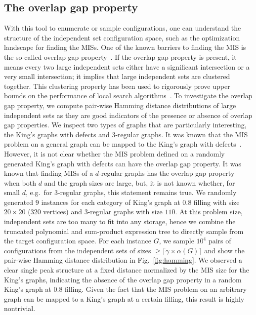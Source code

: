 \documentclass[onefignum, onetabnum]{siamart190516}
\newcommand{\<}{\langle}
\renewcommand{\>}{\rangle}
\newcommand{\Fig}[1]{Fig.~\ref{#1}}
\begin{document}
\subsection{The overlap gap property\label{sec:overlap-gap}}
With this tool to enumerate or sample configurations, one can understand the structure of the independent set configuration space, such as the optimization landscape for finding the MISs.
One of the known barriers to finding the MIS is the so-called overlap gap property~\cite{Gamarnik2013, Gamarnik2019}.
If the overlap gap property is present, it means every two large independent sets either have a significant intersection or a very small intersection;
it implies that large independent sets are clustered together.
This clustering property has been used to rigorously prove upper bounds on the performance of local search algorithms~\cite{Gamarnik2013, Gamarnik2019}.
To investigate the overlap gap property, we compute pair-wise Hamming distance distributions of large independent sets as they are good indicators of the presence or absence of overlap gap properties.
We inspect two types of graphs that are particularly interesting, the King's graphs with defects and $3$-regular graphs.
It was known that the MIS problem on a general graph can be mapped to the King's graph with defects~\cite{Ebadi2022}. However, it is not clear whether the MIS problem defined on a randomly generated King's graph with defects can have the overlap gap property.
It was known that finding MISs of a $d$-regular graphs has the overlap gap property~\cite{Rahman2017,Gamarnik2021} when both $d$ and the graph sizes are large, but, it is not known whether, for small $d$, e.g.\ for $3$-regular graphs, this statement remains true.
We randomly generated $9$ instances for each category of King's graph at $0.8$ filling with size $20\times 20$ ($320$ vertices) and $3$-regular graphs with size $110$.
At this problem size, independent sets are too many to fit into any storage, hence we combine the truncated polynomial and sum-product expression tree to directly sample from the target configuration space.
For each instance $G$, we sample $10^4$ pairs of configurations from the independent sets of sizes $\geq \lceil \gamma \times \alpha(G)\rceil$ and show the pair-wise Hamming distance distribution in \Fig{fig:hamming}.
We observed a clear single peak structure at a fixed distance normalized by the MIS size for the King's graphs, indicating the absence of the overlap gap property in a random King's graph at $0.8$ filling.
Given the fact that the MIS problem on an arbitrary graph can be mapped to a King's graph at a certain filling, this result is highly nontrivial.
\end{document}
